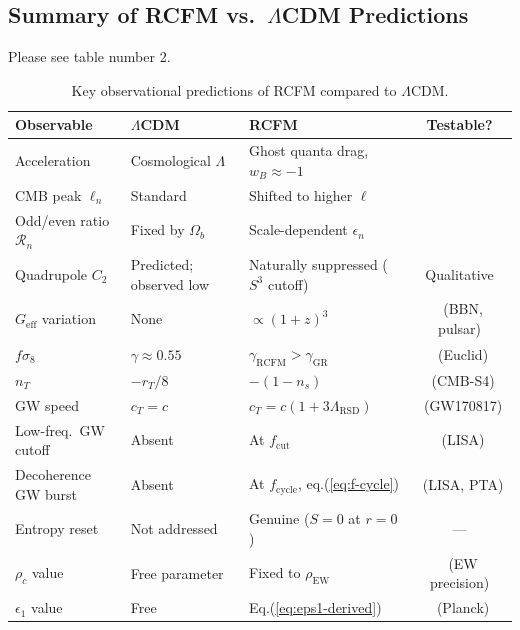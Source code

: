 \documentclass[10pt,twocolumn]{article}
\theoremstyle{definition}
\newcommand{\rhoc}{\rho_{c}}
\newcommand{\rhoEW}{\rho_{\mathrm{EW}}}
\DeclareRobustCommand{\onecoltable}[2][]{%
  \begin{table}[#1]%
    \centering
    #2
  \end{table}%
}
\begin{document}
\subsection{Summary of RCFM vs.\ $\Lambda$CDM Predictions}  

Please see table number 2.

\onecoltable[htb]{%
 \centering
 \caption{Key observational predictions of RCFM compared to $\Lambda$CDM.}
  \label{tab:predictions}
  \begin{tabular}{p{2.8cm}p{3.5cm}p{3.5cm}c}
  \toprule
  Observable
    & $\Lambda$CDM
    & RCFM
    & Testable?\\
  \midrule
  Acceleration
    & Cosmological \( \Lambda \)
    & Ghost quanta drag, \( w_{B}\approx-1 \)
    & \checkmark\\
  CMB peak \( \ell_{n} \)
    & Standard
    & Shifted to higher \( \ell \)
    & \checkmark\\
  Odd/even ratio \( \mathcal{R}_{n} \)
    & Fixed by \( \Omega_{b} \)
    & Scale-dependent \( \epsilon_{n} \)
    & \checkmark\\
  Quadrupole \( C_{2} \)
    & Predicted; observed low
    & Naturally suppressed (\( S^{3} \) cutoff)
    & Qualitative\\
  \( G_{\mathrm{eff}} \) variation
    & None
    & \( \propto(1+z)^{3} \)
    & \checkmark\ (BBN, pulsar)\\
  \( f\sigma_{8} \)
    & \( \gamma\approx0.55 \)
    & \( \gamma_{\mathrm{RCFM}}>\gamma_{\mathrm{GR}} \)
    & \checkmark\ (Euclid)\\
  \( n_{T} \)
    & \( -r_{T}/8 \)
    & \( -(1-n_{s}) \)
    & \checkmark\ (CMB-S4)\\
  GW speed
    & \( c_{T}=c \)
    & \( c_{T}=c(1+3\Lambda_{\mathrm{RSD}}) \)
    & \checkmark\ (GW170817)\\
  Low-freq.\ GW cutoff
    & Absent
    & At \( f_{\mathrm{cut}} \)
    & \checkmark\ (LISA)\\
  Decoherence GW burst
    & Absent
    & At \( f_{\mathrm{cycle}} \), eq.\nobreakspace{}(\ref{eq:f-cycle})
    & \checkmark\ (LISA, PTA)\\
  Entropy reset
    & Not addressed
    & Genuine (\( S=0 \) at \( r=0 \))
    & ---\\
  \( \rhoc \) value
    & Free parameter
    & Fixed to \( \rhoEW \)
    & \checkmark\ (EW precision)\\
  \( \epsilon_{1} \) value
    & Free
    & Eq.\nobreakspace{}(\ref{eq:eps1-derived})
    & \checkmark\ (Planck)\\
  \bottomrule
  \end{tabular}
}
\end{document}
